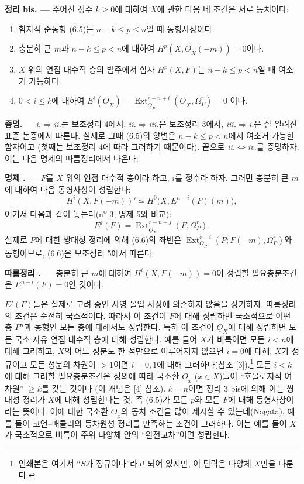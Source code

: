 \documentclass[11pt,twoside,openany]{book}
\numberwithin{equation}{section}
\newcommand{\sourceunit}{front}
\newcommand{\src}[1]{%
  \phantomsection\hypertarget{src:\sourceunit:#1}{}%
  \marginpar{\raggedleft\footnotesize\sffamily #1}%
}
\newcommand{\Osh}{\underline{O}}
\newcommand{\Extsh}{\underline{\operatorname{Ext}}}
\theoremstyle{plain}
\theoremstyle{definition}
\theoremstyle{remark}
\newcommand{\result}[2]{%
  \par\medskip\noindent\textbf{#1%
  \if\relax\detokenize{#2}\relax\else\space#2\fi. ---}\enspace
}
\begin{document}
\result{정리}{3 bis} 주어진 정수 $k\geq0$에 대하여 $X$에 관한
다음 네 조건은 서로 동치이다:
\begin{enumerate}
  \item[\textit{i.}] 함자적 준동형 (6.5)는 $n-k\leq p\leq n$일 때
    동형사상이다.
  \item[\textit{ii.}] 충분히 큰 $m$과 $n-k\leq p<n$에 대하여
    $H^{p}(X,\Osh_X(-m))=0$이다.
  \item[\textit{iii.}] $X$ 위의 연접 대수적 층의 범주에서 함자
    $H^{p}(X,F)$는 $n-k\leq p<n$일 때 여소거 가능하다.
  \item[\textit{iv.}] $0<i\leq k$에 대하여
    $E^{i}(\Osh_X)=\Extsh_{\Osh_P}^{r-n+i}(\Osh_X,\Omega_P^{r})=0$
    이다.
\end{enumerate}

\noindent\textbf{증명.} --- \textit{i.}$\Rightarrow$\textit{ii.}는
보조정리 4에서, \textit{ii.}$\Rightarrow$\textit{iii.}은 보조정리 3에서,
\textit{iii.}$\Rightarrow$\textit{i.}은 잘 알려진 표준 논증에서 따른다.
실제로 그때 (6.5)의 양변은 $n-k\leq p<n$에서 여소거 가능한 함자이고
(첫째는 보조정리 4에 따라 그러하기 때문이다). 끝으로
\textit{ii.}$\Leftrightarrow$\textit{iv.}를 증명하자. 이는 다음 명제의
따름정리에서 나온다:

\result{명제}{6} $F$를 $X$ 위의 연접 대수적 층이라 하고,
$i$를 정수라 하자. 그러면 충분히 큰 $m$에 대하여 다음 동형사상이 성립한다:
\begin{equation}\tag{6.6}
  H^{i}(X,F(-m))'
  \simeq H^{0}\bigl(X,E^{n-i}(F)(m)\bigr),
\end{equation}
여기서 다음과 같이 놓는다(n\textsuperscript{o} 3, 명제 5와 비교):
\begin{equation}\tag{6.7}
  E^{j}(F)=\Extsh_{\Osh_P}^{r-n+j}(F,\Omega_P^{r}).
\end{equation}
실제로 $P$에 대한 쌍대성 정리에 의해 (6.6)의 좌변은
$\operatorname{Ext}_{\Osh_P}^{r-i}(P;F(-m),\Omega_P^{r})$와 동형이므로,
(6.6)은 보조정리 5에서
따른다.

\src{187}
\result{따름정리}{} 충분히 큰 $m$에 대하여 $H^{i}(X,F(-m))=0$이
성립할 필요충분조건은 $E^{n-i}(F)=0$인 것이다.

$E^{j}(F)$들은 실제로 고려 중인 사영 몰입 사상에 의존하지 않음을 상기하자.
따름정리의 조건은 순전히 국소적이다. 따라서
이 조건이 $F$에 대해 성립하면 국소적으로
어떤 층 $F^{n}$과 동형인 모든 층에 대해서도 성립한다. 특히 이 조건이
$\Osh_X$에 대해 성립하면 모든 국소 자유 연접 대수적 층에 대해
성립한다. 예를 들어 $X$가 비특이면 모든 $i<n$에 대해 그러하고,
$X$의 어느 성분도 한 점만으로 이루어지지 않으면 $i=0$에 대해,
$X$가 정규이고 모든 성분의 차원이 $>1$이면 $i=0,1$에 대해 그러하다(참조
[3]).\footnote{인쇄본은 여기서 ``$S$가 정규이다''라고 되어 있지만, 이 단락은
다양체 $X$만을 다룬다.} 모든 $i<k$에 대해 그러할 필요충분조건은
정의에 따라 국소환
$\Osh_x$ ($x\in X$)들이 ``호몰로지적 여차원'' $\geq k$를 갖는 것이다
(이 개념은 [4] 참조). $k=n$이면 정리 3 bis에 의해 이는
쌍대성 정리가 $X$에 대해 성립한다는 것, 즉 (6.5)가
모든 $p$와 모든 $F$에 대해 동형사상이라는 뜻이다. 이에 대한 국소환
$\Osh_x$의 동치 조건을 많이 제시할 수 있는데(Nagata), 예를 들어
코언--매콜리의 등차원성 정리를 만족하는 조건이 그러하다. 이는
예를 들어 $X$가 국소적으로 비특이 주위 다양체 안의 ``완전교차''이면
성립한다.
\end{document}

